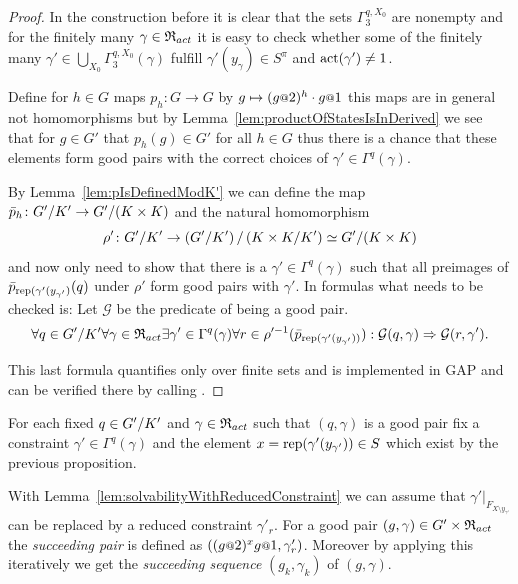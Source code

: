 \documentclass[a4paper,11pt]{amsart}
\begin{document}
\begin{proof}
 In the construction before it is clear that the sets $\Gamma_3^{q,X_0}$ are nonempty and for the finitely many $\gamma\in \mathfrak{R}_{act}$ it is
 easy to check whether some of the finitely many $\gamma'\in\bigcup_{X_0}\Gamma_3^{q,X_0}(\gamma)$ fulfill $\gamma'(y_\gamma) \in S^\pi$ and $\operatorname{act}(\gamma')\neq 1$.
 
 
  Define for $h\in G$ maps $p_h\colon G\to G$ by $g\mapsto (g\at{2})^{h}\cdot g\at{1}$ this maps are in general not homomorphisms but 
  by Lemma~\ref{lem:productOfStatesIsInDerived} we see that for $g\in G'$ that $p_h(g)\in G'$ for all $h\in G$ thus there is a chance that these elements form good pairs with
  the correct choices of $\gamma' \in \Gamma^q(\gamma)$. 
 
  By Lemma~\ref{lem:pIsDefinedModK'} we can define the map $\bar p_h\colon {G'/K'} \to {G'/(K\times K)}$
 and the natural homomorphism \[\rho'\colon {G'/K'} \to {\left({G'/K'}\right)/\left({K\times K/K'}\right)} \simeq {G'/(K\times K)} \]
 and now only need to show that there is a $\gamma'\in\Gamma^q(\gamma)$ such that all preimages of $\bar p_{\textup{rep}(\gamma'(y_{\gamma'})}(q)$ under $\rho'$ 
 form good pairs with $\gamma'$. In formulas what needs to be checked is: Let $\mathcal{G}$ be the predicate of being a good pair. %
 \[\forall q\in{G'/K'}
      \forall \gamma\in\mathfrak{R}_{act} 
	 \exists \gamma'\in \Gamma^q(\gamma)
	    \forall r\in \rho'^{-1}(\bar p_{\textup{rep}(\gamma'(y_{\gamma'}))}):
	      \mathcal{G}(q,\gamma) \Rightarrow \mathcal{G}(r,\gamma').\]
 
 This last formula quantifies only over finite sets and is implemented in GAP and can be verified there by calling . 
 \end{proof}

 \begin{defi}
 For each fixed $q\in{G'/K'}$ and $\gamma\in \mathfrak{R}_{act}$ such that $(q,\gamma)$ is a good pair
 fix a constraint $\gamma'\in\Gamma^q(\gamma)$ and the element $x=\textup{rep}(\gamma'(y_{\gamma'}))\in S$ which exist by the previous proposition.
 
 With Lemma~\ref{lem:solvabilityWithReducedConstraint} we can assume that $\gamma'|_{F_{X\setminus y_{\gamma'}}}$ can be replaced by a reduced constraint $\gamma'_r$. 
 For a good pair $(g,\gamma)\in G'\times\mathfrak{R}_{act}$ the \emph{succeeding pair} is defined as $\left((g\at{2})^xg\at{1},\gamma'_r\right)$.
 Moreover by applying this iteratively we get the \emph{succeeding sequence} $(g_k,\gamma_k)$ of $(g,\gamma)$.
 \end{defi}
 
\end{document}
